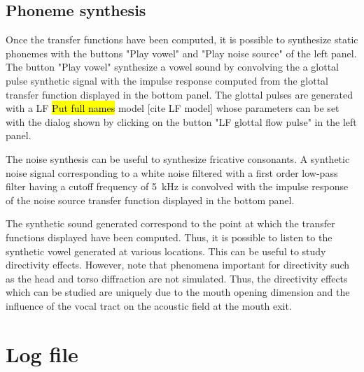 \documentclass[]{article}
\begin{document}
	\subsection{Phoneme synthesis}
	
	Once the transfer functions have been computed, it is possible to synthesize 
	static phonemes with the buttons "Play vowel" and "Play noise source" of the left panel.
	The button "Play vowel" synthesize a vowel sound by convolving the a glottal pulse
	synthetic signal with the impulse response computed from the glottal transfer function
	displayed in the bottom panel. 
	The glottal pulses are generated with a LF \hl{Put full names} model [cite LF model]
	whose parameters can be set with the dialog shown by clicking on the button 
	"LF glottal flow pulse" in the left panel.
	
	The noise synthesis can be useful to synthesize fricative consonants.
	A synthetic noise signal corresponding to a white noise filtered with a first order 
	low-pass filter having a cutoff frequency of 5~kHz is convolved with the 
	impulse response of the noise source transfer function displayed in the bottom panel.
	
	The synthetic sound generated correspond to the point at which the transfer functions
	displayed have been computed.
	Thus, it is possible to listen to the synthetic vowel generated at various locations.
	This can be useful to study directivity effects.
	However, note that phenomena important for directivity such as the head and torso
	diffraction are not simulated. Thus, the directivity effects which can be studied 
	are uniquely due to the mouth opening dimension and the influence of the vocal tract
	on the acoustic field at the mouth exit.
	
	\section{Log file}
	
\end{document}
